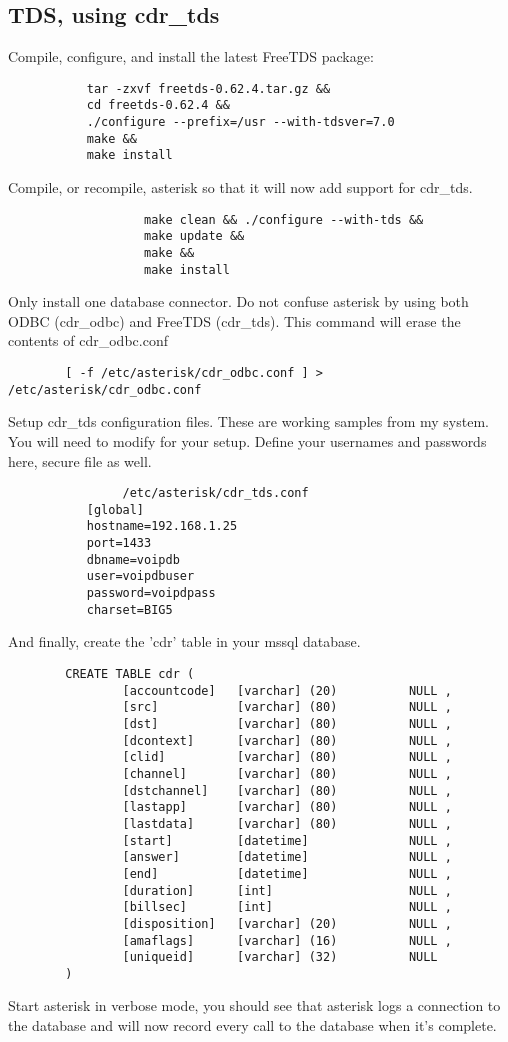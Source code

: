 \subsection{TDS, using cdr\_tds}
		Compile, configure, and install the latest FreeTDS package:
\begin{verbatim}
		   tar -zxvf freetds-0.62.4.tar.gz &&
		   cd freetds-0.62.4 &&
		   ./configure --prefix=/usr --with-tdsver=7.0
		   make &&
		   make install
\end{verbatim}
                Compile, or recompile, asterisk so that it will now add support
                for cdr\_tds.
\begin{verbatim}
                   make clean && ./configure --with-tds &&
                   make update &&
                   make &&
                   make install
\end{verbatim}
                Only install one database connector.  Do not confuse asterisk
                by using both ODBC (cdr\_odbc) and FreeTDS (cdr\_tds).
                This command will erase the contents of cdr\_odbc.conf
\begin{verbatim}
		[ -f /etc/asterisk/cdr_odbc.conf ] > /etc/asterisk/cdr_odbc.conf
\end{verbatim}
                Setup cdr\_tds configuration files.  These are working samples
                from my system.  You will need to modify for your setup. Define
                your usernames and passwords here, secure file as well.
\begin{verbatim}
                /etc/asterisk/cdr_tds.conf
		   [global]
		   hostname=192.168.1.25
		   port=1433
		   dbname=voipdb
		   user=voipdbuser
		   password=voipdpass
		   charset=BIG5
\end{verbatim}
                And finally, create the 'cdr' table in your mssql database.
\begin{verbatim}
		CREATE TABLE cdr (
		        [accountcode]   [varchar] (20)          NULL ,
		        [src]           [varchar] (80)          NULL ,
		        [dst]           [varchar] (80)          NULL ,
		        [dcontext]      [varchar] (80)          NULL ,
		        [clid]          [varchar] (80)          NULL ,
		        [channel]       [varchar] (80)          NULL ,
		        [dstchannel]    [varchar] (80)          NULL ,
		        [lastapp]       [varchar] (80)          NULL ,
		        [lastdata]      [varchar] (80)          NULL ,
		        [start]         [datetime]              NULL ,
		        [answer]        [datetime]              NULL ,
		        [end]           [datetime]              NULL ,
		        [duration]      [int]                   NULL ,
		        [billsec]       [int]                   NULL ,
		        [disposition]   [varchar] (20)          NULL ,
		        [amaflags]      [varchar] (16)          NULL ,
		        [uniqueid]      [varchar] (32)          NULL
		)
\end{verbatim}
                Start asterisk in verbose mode, you should see that asterisk
                logs a connection to the database and will now record every
                call to the database when it's complete.


